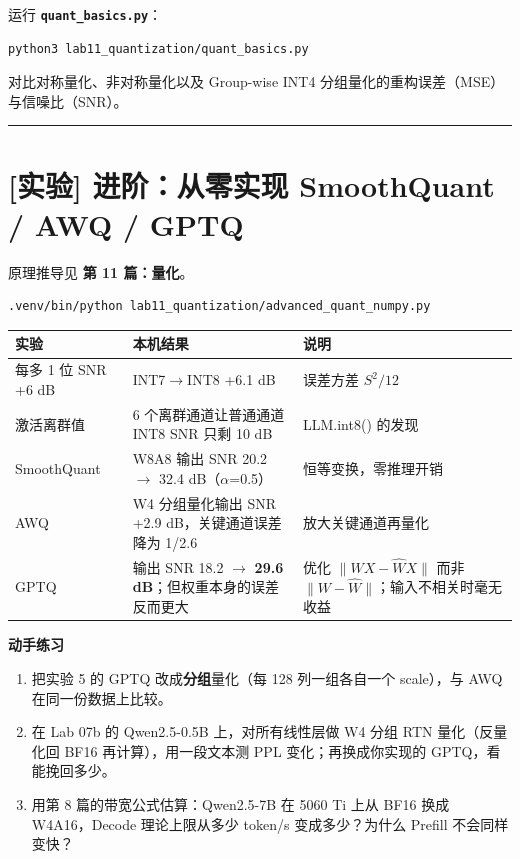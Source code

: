 运行 \textbf{\texttt{quant\_basics.py}}：

\begin{lstlisting}[language=bash]
python3 lab11_quantization/quant_basics.py
\end{lstlisting}

对比对称量化、非对称量化以及 Group-wise INT4 分组量化的重构误差（MSE）与信噪比（SNR）。

\vspace{0.8em}\hrule\vspace{0.8em}

\section{[实验] 进阶：从零实现 SmoothQuant / AWQ / GPTQ}

原理推导见 \textbf{第 11 篇：量化}。

\begin{lstlisting}[language=bash]
.venv/bin/python lab11_quantization/advanced_quant_numpy.py
\end{lstlisting}

\begin{center}
\small
\begin{tabularx}{\textwidth}{p{3cm} p{4.5cm} X}
\toprule
\textbf{实验} & \textbf{本机结果} & \textbf{说明} \\
\midrule
每多 1 位 SNR +6 dB & INT7$\rightarrow$INT8 +6.1 dB & 误差方差 $S^2/12$ \\
激活离群值 & 6 个离群通道让普通通道 INT8 SNR 只剩 10 dB & LLM.int8() 的发现 \\
SmoothQuant & W8A8 输出 SNR 20.2 $\rightarrow$ 32.4 dB（$\alpha$=0.5） & 恒等变换，零推理开销 \\
AWQ & W4 分组量化输出 SNR +2.9 dB，关键通道误差降为 1/2.6 & 放大关键通道再量化 \\
GPTQ & 输出 SNR 18.2 $\rightarrow$ \textbf{29.6 dB}；但权重本身的误差反而更大 & 优化 $\|WX - \hat WX\|$ 而非 $\|W - \hat W\|$；输入不相关时毫无收益 \\
\bottomrule
\end{tabularx}
\end{center}

\textbf{动手练习}
\begin{enumerate}
  \item 把实验 5 的 GPTQ 改成\textbf{分组}量化（每 128 列一组各自一个 scale），与 AWQ 在同一份数据上比较。
  \item 在 Lab 07b 的 Qwen2.5-0.5B 上，对所有线性层做 W4 分组 RTN 量化（反量化回 BF16 再计算），用一段文本测 PPL 变化；再换成你实现的 GPTQ，看能挽回多少。
  \item 用第 8 篇的带宽公式估算：Qwen2.5-7B 在 5060 Ti 上从 BF16 换成 W4A16，Decode 理论上限从多少 token/s 变成多少？为什么 Prefill 不会同样变快？
\end{enumerate}



